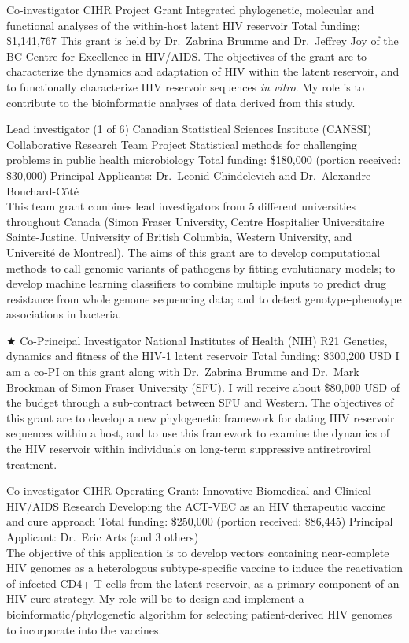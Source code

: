 {Co-investigator}
{CIHR Project Grant}  %
{Integrated phylogenetic, molecular and functional analyses of the within-host latent HIV reservoir}
{Total funding: \$1,141,767}
{
This grant is held by Dr.~Zabrina Brumme and Dr.~Jeffrey Joy of the BC Centre for Excellence in HIV/AIDS.
The objectives of the grant are to characterize the dynamics and adaptation of HIV within the latent reservoir, and to functionally characterize HIV reservoir sequences \textit{in vitro}.
My role is to contribute to the bioinformatic analyses of data derived from this study.
}

{Lead investigator (1 of 6)}
{Canadian Statistical Sciences Institute (CANSSI) Collaborative Research Team Project}
{Statistical   methods   for   challenging   problems   in   public   health   microbiology}
{Total funding: \$180,000 (portion received: \$30,000)}
{Principal Applicants: Dr.~Leonid Chindelevich and Dr.~Alexandre Bouchard-C\^ot\'e\\
This team grant combines lead investigators from 5 different universities throughout Canada (Simon Fraser University,  Centre Hospitalier Universitaire Sainte-Justine, University of British Columbia, Western University, and Universit\'e de Montreal).
The aims of this grant are to develop computational methods to call genomic variants of pathogens by fitting evolutionary models; to develop machine learning classifiers to combine multiple inputs to predict drug resistance from whole genome sequencing data; and to detect genotype-phenotype associations in bacteria.\\
}



{$\bigstar$ Co-Principal Investigator}
{National Institutes of Health (NIH) R21}  %
{Genetics, dynamics and fitness of the HIV-1 latent reservoir}
{Total funding: \$300,200 USD}
{
I am a co-PI on this grant along with Dr.~Zabrina Brumme and Dr.~Mark Brockman of Simon Fraser University (SFU).
I will receive about \$80,000 USD of the budget through a sub-contract between SFU and Western.
The objectives of this grant are to develop a new phylogenetic framework for dating HIV reservoir sequences within a host, and to use this framework to examine the dynamics of the HIV reservoir within individuals on long-term suppressive antiretroviral treatment.
}

{Co-investigator}
{CIHR Operating Grant: Innovative Biomedical and Clinical HIV/AIDS Research}
{Developing the ACT-VEC as an HIV therapeutic vaccine and cure approach}
{Total funding: \$250,000 (portion received: \$86,445)}
{
Principal Applicant: Dr.~Eric Arts (and 3 others)\\
The objective of this application is to develop vectors containing near-complete HIV genomes as a heterologous subtype-specific vaccine to induce the reactivation of infected CD4+ T cells from the latent reservoir, as a primary component of an HIV cure strategy.
My role will be to design and implement a bioinformatic/phylogenetic algorithm for selecting patient-derived HIV genomes to incorporate into the vaccines.\\
}


